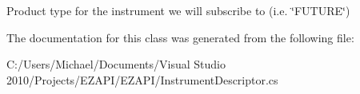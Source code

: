 Product type for the instrument we will subscribe to (i.\-e. \char`\"{}\-F\-U\-T\-U\-R\-E\char`\"{}) 



The documentation for this class was generated from the following file\-:\begin{DoxyCompactItemize}
\item 
C\-:/\-Users/\-Michael/\-Documents/\-Visual Studio 2010/\-Projects/\-E\-Z\-A\-P\-I/\-E\-Z\-A\-P\-I/Instrument\-Descriptor.\-cs\end{DoxyCompactItemize}

